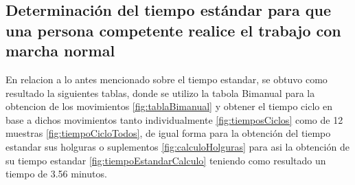     \subsection{Determinación del tiempo estándar para que una persona competente realice el trabajo con marcha normal}
    En relacion a lo antes mencionado sobre el tiempo estandar, se obtuvo como resultado la siguientes tablas, donde se utilizo la tabola Bimanual para la obtencion de los movimientos \ref{fig:tablaBimanual} y obtener el tiempo ciclo en base a dichos movimientos tanto individualmente \ref{fig:tiemposCiclos} como de 12 muestras \ref{fig:tiempoCicloTodos}, de igual forma para la obtención del tiempo estandar sus holguras o suplementos \ref{fig:calculoHolguras} para asi la obtención de su tiempo estandar \ref{fig:tiempoEstandarCalculo} teniendo como resultado un tiempo de 3.56 minutos.
    
